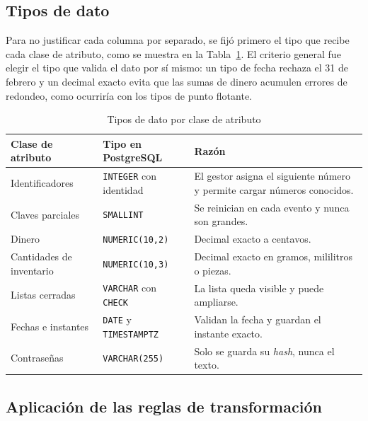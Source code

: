 \subsection{Tipos de dato}

Para no justificar cada columna por separado, se fijó primero el tipo que recibe cada clase de atributo, como se muestra en la Tabla~\ref{tab:tipos}. El criterio general fue elegir el tipo que valida el dato por sí mismo: un tipo de fecha rechaza el 31 de febrero y un decimal exacto evita que las sumas de dinero acumulen errores de redondeo, como ocurriría con los tipos de punto flotante.

\begin{table}[H]
    \centering
    \small
    \begin{tabularx}{\textwidth}
        {
            >{\RaggedRight\arraybackslash}p{3.6cm}
            >{\RaggedRight\arraybackslash}p{4.2cm}
            >{\RaggedRight\arraybackslash}X
        }
        \toprule
        \textbf{Clase de atributo} & \textbf{Tipo en PostgreSQL} & \textbf{Razón} \\
        \midrule
        Identificadores & \texttt{INTEGER} con identidad & El gestor asigna el siguiente número y permite cargar números conocidos. \\
        Claves parciales & \texttt{SMALLINT} & Se reinician en cada evento y nunca son grandes. \\
        Dinero & \texttt{NUMERIC(10,2)} & Decimal exacto a centavos. \\
        Cantidades de inventario & \texttt{NUMERIC(10,3)} & Decimal exacto en gramos, mililitros o piezas. \\
        Listas cerradas & \texttt{VARCHAR} con \texttt{CHECK} & La lista queda visible y puede ampliarse. \\
        Fechas e instantes & \texttt{DATE} y \texttt{TIMESTAMPTZ} & Validan la fecha y guardan el instante exacto. \\
        Contraseñas & \texttt{VARCHAR(255)} & Solo se guarda su \textit{hash}, nunca el texto. \\
        \bottomrule
    \end{tabularx}
    \captionsetup{labelfont=bf, textfont=it, labelsep=newline, justification=raggedright, singlelinecheck=false}
    \caption{Tipos de dato por clase de atributo}
    \label{tab:tipos}
\end{table}

\subsection{Aplicación de las reglas de transformación}

